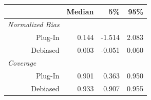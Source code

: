 
\begin{tabular}{r|rrr}
\toprule
  & Median & 5\% & 95\%\\
\midrule
\multicolumn{1}{l|}{\textit{Normalized Bias}}\\
Plug-In & 0.144 & -1.514 & 2.083\\
Debiased & 0.003 & -0.051 & 0.060\\
\midrule
\multicolumn{1}{l|}{\textit{Coverage}}\\
Plug-In & 0.901 & 0.363 & 0.950\\
Debiased & 0.933 & 0.907 & 0.955\\
\bottomrule
\end{tabular}
